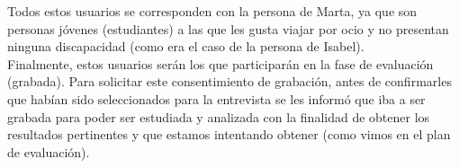 Todos estos usuarios se corresponden con la persona de Marta, ya que son personas jóvenes (estudiantes) a las que les gusta viajar por ocio y no presentan ninguna discapacidad
(como era el caso de la persona de Isabel). \\

Finalmente, estos usuarios serán los que participarán en la fase de evaluación (grabada). Para solicitar este consentimiento de grabación, antes de confirmarles que 
habían sido seleccionados para la entrevista se les informó que iba a ser grabada para poder ser estudiada y analizada con la finalidad de obtener los resultados
pertinentes y que estamos intentando obtener (como vimos en el plan de evaluación).